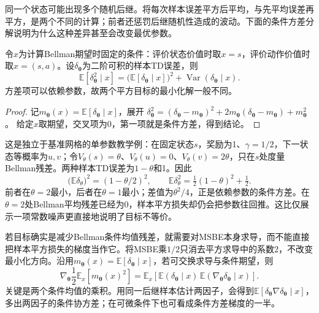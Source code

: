 同一个状态可能出现多个随机后继。将每次样本误差平方后平均，与先平均误差再平方，是两个不同的计算；前者还惩罚后继随机性造成的波动。下面的条件方差分解说明为什么这种差异甚至会改变最优参数。

\begin{theorem}[样本平方误差的条件方差分解]
  \label{thm:rl-learning-td-variance}
  令$x$为计算Bellman期望时固定的条件：评价状态价值时取$x=s$，评价动作价值时取$x=(s,a)$。设$\delta_{\bm{\theta}}$为二阶可积的样本TD误差，则
  \begin{equation}
    \mathbb E[\delta_{\bm{\theta}}^2\mid x]
      =\bigl(\mathbb E[\delta_{\bm{\theta}}\mid x]\bigr)^2
          +\operatorname{Var}(\delta_{\bm{\theta}}\mid x).
    \label{eq:rl-learning-td-variance}
  \end{equation}
  方差项可以依赖参数，故两个平方目标的最小化解一般不同。
\end{theorem}
\begin{proof}
  记$m_{\bm{\theta}}(x)=\mathbb E[\delta_{\bm{\theta}}\mid x]$，展开
  $\delta_{\bm{\theta}}^2=(\delta_{\bm{\theta}}-m_{\bm{\theta}})^2
    +2m_{\bm{\theta}}(\delta_{\bm{\theta}}-m_{\bm{\theta}})
    +m_{\bm{\theta}}^2$。
  给定$x$取期望，交叉项为0，第一项就是条件方差，得到结论。
\end{proof}

\begin{example}[两个后继使最优参数改变]
  \label{ex:rl-learning-double-sampling}
  这是独立于基准网格的单参数教学例：在固定状态$s$，奖励为1、$\gamma=1/2$，下一状态等概率为$u,v$；令$V_\theta(s)=\theta$、$V_\theta(u)=0$、$V_\theta(v)=2\theta$，只在$s$处度量Bellman残差。两种样本TD误差为$1-\theta$和1。因此
  \[
    \bigl(\mathbb E\delta_\theta\bigr)^2=(1-\theta/2)^2,\qquad
    \mathbb E\delta_\theta^2=\tfrac12(1-\theta)^2+\tfrac12.
  \]
  前者在$\theta=2$最小，后者在$\theta=1$最小；差值为$\theta^2/4$，正是依赖参数的条件方差。在$\theta=2$处Bellman平均残差已经为0，样本平方损失却仍会把参数往回推。这比仅展示一项常数噪声更直接地说明了目标不等价。
\end{example}

若目标确实是减少Bellman条件均值残差，就需要对MSBE本身求导，而不能直接把样本平方损失的梯度当作它。将MSBE乘$1/2$只消去平方求导中的系数2，不改变最小化方向。沿用$m_{\bm\theta}(x)=\mathbb E[\delta_{\bm\theta}\mid x]$，若可交换求导与条件期望，则
\begin{equation}
  \nabla_{\bm{\theta}}\frac12\mathbb E_x[m_{\bm{\theta}}(x)^2]
    =\mathbb E_x\!\left[
        \mathbb E(\delta_{\bm{\theta}}\mid x)\,
        \mathbb E(\nabla_{\bm{\theta}}\delta_{\bm{\theta}}\mid x)
      \right].
  \label{eq:rl-learning-msbe-gradient}
\end{equation}
关键是两个条件均值的乘积。用同一后继样本估计两因子，会得到$\mathbb E[\delta_{\bm{\theta}}\nabla\delta_{\bm{\theta}}\mid x]$，多出两因子的条件协方差；在可微条件下也可看成条件方差梯度的一半。


